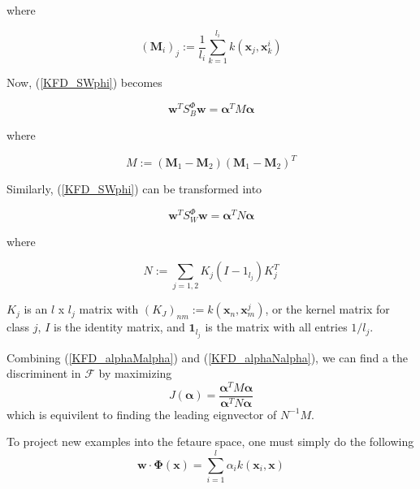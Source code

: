 \documentclass[12pt]{article}
\begin{document}
where

\begin{equation}
(\boldsymbol{M}_i)_j := \frac{1}{l_i}\sum_{k=1}^{l_i} k(\boldsymbol{x}_j, \boldsymbol{x}_k^i)
\label{KFD_M}
\end{equation}

Now, (\ref{KFD_SWphi}) becomes

\begin{equation}
\boldsymbol{w}^T S_B^\Phi \boldsymbol{w} = \boldsymbol{\alpha}^T M \boldsymbol{\alpha}
\label{KFD_alphaMalpha}
\end{equation}

where

\begin{equation}
M := (\boldsymbol{M}_1 -\boldsymbol{M}_2)(\boldsymbol{M}_1 - \boldsymbol{M}_2)^T
\label{KFD_M}
\end{equation}

Similarly, (\ref{KFD_SWphi}) can be transformed into

\begin{equation}
\boldsymbol{w}^T S_W^\Phi \boldsymbol{w} = \boldsymbol{\alpha}^T N \boldsymbol{\alpha}
\label{KFD_alphaNalpha}
\end{equation}

where

\begin{equation}
N := \sum_{j=1,2} K_j(I-1_{l_j})K_j^T
\label{KFD_N}
\end{equation}

$K_j$ is an $l$ x $l_j$ matrix with $(K_J)_{nm} := k(\boldsymbol{x}_n, \boldsymbol{x}_m^j)$, or the kernel matrix for class $j$, $I$ is the identity matrix, and $\boldsymbol{1}_{l_j}$ is the matrix with all entries $1/l_j$.

Combining (\ref{KFD_alphaMalpha}) and (\ref{KFD_alphaNalpha}), we can find a the discriminent in $\mathcal{F}$ by maximizing
\begin{equation}
J(\boldsymbol{\alpha}) = \frac{\boldsymbol{\alpha}^T M \boldsymbol{\alpha}}{\boldsymbol{\alpha}^T N \boldsymbol{\alpha}}
\label{KFD_Jalpha}
\end{equation}
which is equivilent to finding the leading eignvector of $N^{-1}M$.

To project new examples into the fetaure space, one must simply do the following
\begin{equation}
\boldsymbol{w} \cdot \boldsymbol{\Phi(x)} = \sum_{i=1}^{l} \alpha_i k(\boldsymbol{x}_i, \boldsymbol{x})
\label{KFD_testprojection}
\end{equation}
\end{document}
